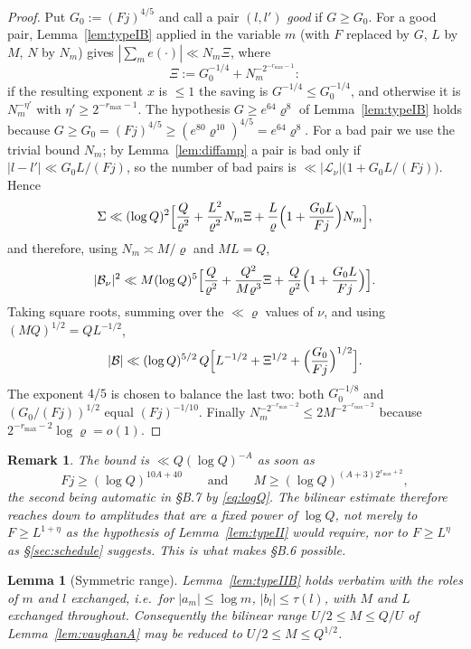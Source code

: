 \documentclass[11pt]{article}
\newtheorem{lemma}[theorem]{Lemma}
\newtheorem{remark}[theorem]{Remark}
\theoremstyle{definition}
\theoremstyle{plain}
\begin{document}
\begin{proof}
Put $G_{0}:=(Fj)^{4/5}$ and call a pair $(l,l')$ \emph{good} if
$G\ge G_{0}$.  For a good pair, Lemma~\ref{lem:typeIB} applied in the
variable $m$ (with $F$ replaced by $G$, $L$ by $M$, $N$ by $N_{m}$) gives
$|\sum_{m}e(\cdot)|\ll N_{m}\Xi$, where
\[
\Xi:=G_{0}^{-1/4}+N_{m}^{-2^{-r_{\max}-1}} :
\]
if the resulting exponent $x$ is $\le1$ the saving is
$G^{-1/4}\le G_{0}^{-1/4}$, and otherwise it is $N_{m}^{-\eta'}$ with
$\eta'\ge2^{-r_{\max}-1}$.  The hypothesis $G\ge e^{64}\varrho^{8}$ of
Lemma~\ref{lem:typeIB} holds because
$G\ge G_{0}=(Fj)^{4/5}\ge(e^{80}\varrho^{10})^{4/5}=e^{64}\varrho^{8}$.
For a bad pair we use the trivial bound $N_{m}$; by
Lemma~\ref{lem:diffamp} a pair is bad only if
$|l-l'|\ll G_{0}L/(Fj)$, so the number of bad pairs is
$\ll|\mathcal L_{\nu}|\bigl(1+G_{0}L/(Fj)\bigr)$.  Hence
\[
\Sigma\ll(\log Q)^{2}\Bigl[\frac{Q}{\varrho^{2}}
+\frac{L^{2}}{\varrho^{2}}N_{m}\Xi
+\frac{L}{\varrho}\Bigl(1+\frac{G_{0}L}{Fj}\Bigr)N_{m}\Bigr],
\]
and therefore, using $N_{m}\asymp M/\varrho$ and $ML=Q$,
\[
|\mathcal B_{\nu}|^{2}\ll M(\log Q)^{5}
\Bigl[\frac{Q}{\varrho^{2}}+\frac{Q^{2}}{M\varrho^{3}}\Xi
+\frac{Q}{\varrho^{2}}\Bigl(1+\frac{G_{0}L}{Fj}\Bigr)\Bigr].
\]
Taking square roots, summing over the $\ll\varrho$ values of $\nu$, and
using $(MQ)^{1/2}=QL^{-1/2}$,
\[
|\mathcal B|\ll(\log Q)^{5/2}\,Q\Bigl[L^{-1/2}+\Xi^{1/2}
+\Bigl(\frac{G_{0}}{Fj}\Bigr)^{1/2}\Bigr].
\]
The exponent $4/5$ is chosen to balance the last two: both
$G_{0}^{-1/8}$ and $(G_{0}/(Fj))^{1/2}$ equal $(Fj)^{-1/10}$.  Finally
$N_{m}^{-2^{-r_{\max}-2}}\le2M^{-2^{-r_{\max}-2}}$ because
$2^{-r_{\max}-2}\log\varrho=o(1)$.
\end{proof}

\begin{remark}\label{rem:typeIIreach}
The bound is $\ll Q(\log Q)^{-A}$ as soon as
\[
Fj\ge(\log Q)^{10A+40}
\qquad\text{and}\qquad
M\ge(\log Q)^{(A+3)2^{r_{\max}+2}},
\]
the second being automatic in
\S B.7 by \eqref{eq:logQ}.  \emph{The bilinear estimate therefore reaches
down to amplitudes that are a fixed power of $\log Q$}, not merely to
$F\ge L^{1+\eta}$ as the hypothesis of Lemma~\ref{lem:typeII} would
require, nor to $F\ge L^{\eta}$ as \S\ref{sec:schedule} suggests.  This
is what makes \S B.6 possible.
\end{remark}

\begin{lemma}[Symmetric range]\label{lem:typeIIsym}
Lemma~\ref{lem:typeIIB} holds verbatim with the roles of $m$ and $l$
exchanged, i.e.\ for $|a_{m}|\le\log m$, $|b_{l}|\le\tau(l)$, with $M$
and $L$ exchanged throughout.  Consequently the bilinear range
$U/2\le M\le Q/U$ of Lemma~\ref{lem:vaughanA} may be reduced to
$U/2\le M\le Q^{1/2}$.
\end{lemma}
\end{document}
